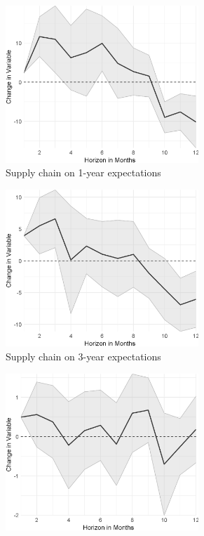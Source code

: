 \newpage
\begin{figure}
	\centering
	\captionsetup{font=footnotesize}
	\begin{subfigure}{00.24\textwidth}
		\includegraphics[width=0.8\textwidth]{output/lp/baseline/bHP/supply_chain/supply_chainonexpectations1y_djn.eps}
		\caption{Supply chain on 1-year expectations}
	\end{subfigure}
	\begin{subfigure}{00.24\textwidth}
		\includegraphics[width=0.8\textwidth]{output/lp/baseline/bHP/supply_chain/supply_chainonexpectations3y_djn.eps}
		\caption{Supply chain on 3-year expectations}
	\end{subfigure}
	\begin{subfigure}{00.24\textwidth}
		\includegraphics[width=0.8\textwidth]{output/lp/baseline/bHP/supply_chain/supply_chainoninflation_djn.eps}

\end{subfigure}
\end{figure}

